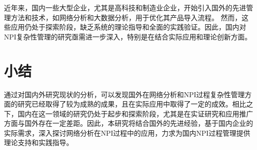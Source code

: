 近年来，国内一些大型企业，尤其是高科技和制造业企业，开始引入国外的先进管理方法和技术，如网络分析和大数据分析，用于优化其产品导入流程。 然而，这些应用仍处于探索阶段，缺乏系统的理论指导和全面的实践验证。因此，国内对NPI复杂性管理的研究亟需进一步深入，特别是在结合实际应用和理论创新方面。

\section{小结}
通过对国内外研究现状的分析，可以发现国外在网络分析和NPI过程复杂性管理方面的研究已经取得了较为成熟的成果，且在实际应用中取得了一定的成效。相比之下，国内在这一领域的研究仍处于起步和探索阶段，尤其是在实证研究和应用推广方面与国外存在一定差距。因此，本研究将结合国外的先进经验，基于国内企业的实际需求，深入探讨网络分析在NPI过程中的应用，力求为国内NPI过程管理提供理论支持和实践指导。

